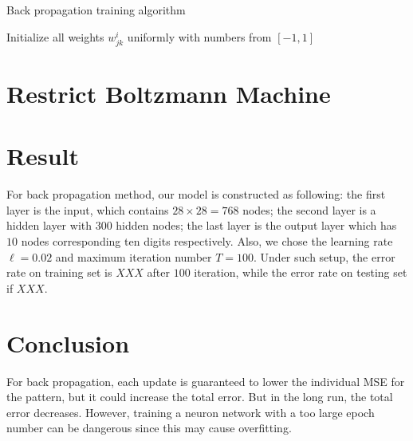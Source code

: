 \documentclass{article} %
\begin{document}
\begin{algorithm}[H]
    \begin{center}
    Back propagation training algorithm
    \end{center}

    Initialize all weights $w_{jk}^i$ uniformly with numbers from $[-1,1]$\;

\end{algorithm}
\section{Restrict Boltzmann Machine}

\section{Result}
For back propagation method, our model is constructed as following: the first layer is the input, which contains $28 \times 28 = 768$ nodes; the second layer is a hidden layer with $300$ hidden nodes; the last layer is the output layer which has $10$ nodes corresponding ten digits respectively.
Also, we chose the learning rate $ \ell = 0.02 $ and maximum iteration number $ T = 100 $.
Under such setup, the error rate on training set is $XXX$ after $100$ iteration, while the error rate on testing set if $XXX$.

\section{Conclusion}
For back propagation, each update is guaranteed to lower the individual MSE for the pattern, but it could increase the total error. 
But in the long run, the total error decreases.
However, training a neuron network with a too large epoch number can be dangerous since this may cause overfitting.

\nocite{*} %
\small{ %

}
\end{document}
